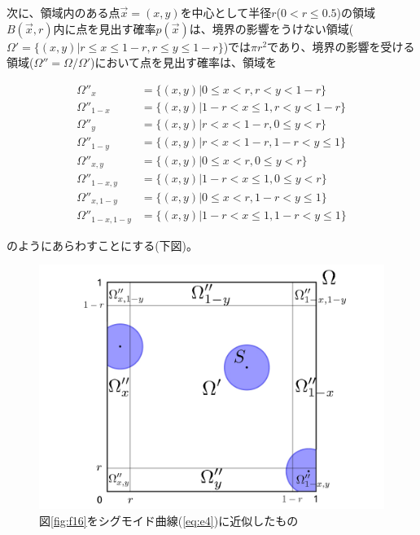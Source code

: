 次に、領域内のある点$\vec x=(x,y)$を中心として半径$r$($0 < r \le 0.5$)の領域$B(\vec x, r)$内に点を見出す確率$p(\vec x)$は、境界の影響をうけない領域($\Omega ' = \{(x,y) | r \le x \le 1-r, r \le y \le 1-r \}$)では$\pi r^{2}$であり、境界の影響を受ける領域($\Omega'' = \Omega / \Omega'$)において点を見出す確率は、領域を

\begin{align}
\Omega''_{x} &= \{(x,y) | 0 \le x < r, r< y < 1-r\} \\
\Omega''_{1-x} &= \{(x,y) | 1-r < x \le 1, r< y < 1-r\} \\
\Omega''_{y} &= \{(x,y) | r < x < 1-r, 0 \le y < r\} \\
\Omega''_{1-y} &= \{(x,y) | r < x < 1-r, 1-r < y \le 1\} \\
\Omega''_{x,y} &= \{(x,y) | 0 \le x < r, 0 \le y < r\} \\
\Omega''_{1-x,y} &= \{(x,y) | 1-r < x \le 1, 0 \le y < r\} \\
\Omega''_{x,1-y} &= \{(x,y) | 0 \le x < r, 1-r < y \le 1\} \\
\Omega''_{1-x, 1-y} &= \{(x,y) | 1-r < x \le 1, 1-r < y \le 1\}
\end{align}

のようにあらわすことにする(下図)。

\begin{figure}[H]
    \begin{center}
        \includegraphics[width=12.5cm]{../img/omega.jpg}
        \caption{図\ref{fig:f16}をシグモイド曲線(\ref{eq:e4})に近似したもの}
        \label{fig:f20}
    \end{center}
\end{figure}

